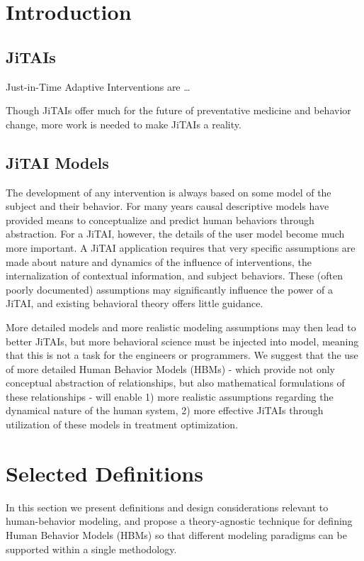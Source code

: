 \documentclass[runningheads,a4paper]{llncs}
\begin{document}
\section{Introduction}
\subsection{JiTAIs}
Just-in-Time Adaptive Interventions are …

Though JiTAIs offer much for the future of preventative medicine and behavior change, more work is needed to make JiTAIs a reality.

\subsection{JiTAI Models}
The development of any intervention is always based on some model of the subject and their behavior. 
For many years causal descriptive models have provided means to conceptualize and predict human behaviors through abstraction.
For a JiTAI, however, the details of the user model become much more important.
A JiTAI application requires that very specific assumptions are made about nature and dynamics of the influence of interventions, the internalization of contextual information, and subject behaviors.
These (often poorly documented) assumptions may significantly influence the power of a JiTAI, and existing behavioral theory offers little guidance.

More detailed models and more realistic modeling assumptions may then lead to better JiTAIs, but more behavioral science must be injected into model, meaning that this is not a task for the engineers or programmers.
We suggest that the use of more detailed Human Behavior Models (HBMs) - which provide not only conceptual abstraction of relationships, but also mathematical formulations of these relationships - will enable 1) more realistic assumptions regarding the dynamical nature of the human system, 2) more effective JiTAIs through utilization of these models in treatment optimization.


\section{Selected Definitions}
In this section we present definitions and design considerations relevant to human-behavior modeling, and propose a theory-agnostic technique for defining Human Behavior Models (HBMs) so that different modeling paradigms can be supported within a single methodology. 
\end{document}
